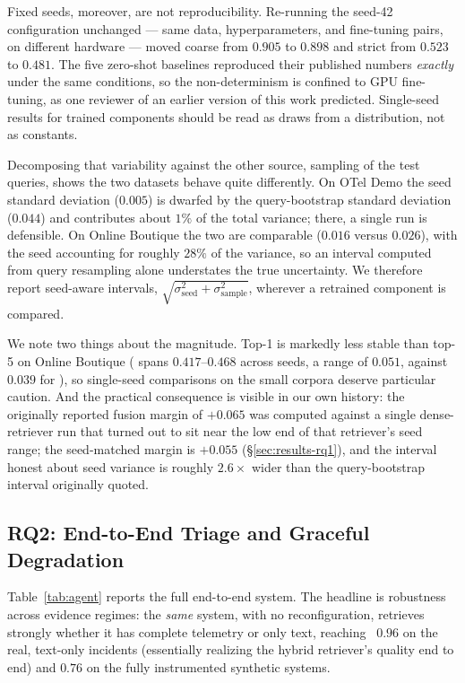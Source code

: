 Fixed seeds, moreover, are not reproducibility. Re-running the seed-42
configuration unchanged --- same data, hyperparameters, and fine-tuning pairs,
on different hardware --- moved coarse  from $0.905$ to $0.898$ and strict
 from $0.523$ to $0.481$. The five zero-shot baselines reproduced their
published numbers \emph{exactly} under the same conditions, so the
non-determinism is confined to GPU fine-tuning, as one reviewer of an earlier
version of this work predicted. Single-seed results for trained components
should be read as draws from a distribution, not as constants.

Decomposing that variability against the other source, sampling of the test
queries, shows the two datasets behave quite differently. On OTel Demo the seed
standard deviation ($0.005$) is dwarfed by the query-bootstrap standard deviation
($0.044$) and contributes about $1\%$ of the total variance; there, a single run
is defensible. On Online Boutique the two are comparable ($0.016$ versus
$0.026$), with the seed accounting for roughly $28\%$ of the variance, so an
interval computed from query resampling alone understates the true uncertainty.
We therefore report seed-aware intervals, $\sqrt{\sigma^2_{\text{seed}}+
\sigma^2_{\text{sample}}}$, wherever a retrained component is compared.

We note two things about the magnitude. Top-1 is markedly less stable than
top-5 on Online Boutique ( spans $0.417$--$0.468$ across seeds, a range of
$0.051$, against $0.039$ for ), so single-seed  comparisons on the
small corpora deserve particular caution. And the practical consequence is
visible in our own history: the originally reported fusion margin of $+0.065$
was computed against a single dense-retriever run that turned out to sit near
the low end of that retriever's seed range; the seed-matched margin is
$+0.055$ (\S\ref{sec:results-rq1}), and the interval honest about seed variance
is roughly $2.6\times$ wider than the query-bootstrap interval originally
quoted.

\subsection{RQ2: End-to-End Triage and Graceful Degradation}
\label{sec:results-rq2}

Table~\ref{tab:agent} reports the full end-to-end system. The headline is
robustness across evidence regimes: the \emph{same} system, with no
reconfiguration, retrieves strongly whether it has complete telemetry or only text,
reaching ~$0.96$ on the real, text-only incidents (essentially realizing the
hybrid retriever's quality end to end) and $0.76$ on the fully instrumented
synthetic systems.

